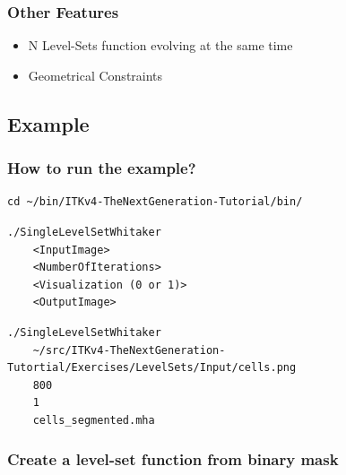 
\begin{frame}
\frametitle{Other Features}
  \begin{itemize}
    \item N Level-Sets function evolving at the same time
    \item Geometrical Constraints
  \end{itemize}
\end{frame}

\subsection{Example}


\begin{frame}[fragile]
  \frametitle{How to run the example?}
  \fontsize{8pt}{8pt}\selectfont
\begin{verbatim}
cd ~/bin/ITKv4-TheNextGeneration-Tutorial/bin/
\end{verbatim}
\newline
\begin{verbatim}
./SingleLevelSetWhitaker
    <InputImage>
    <NumberOfIterations>
    <Visualization (0 or 1)>
    <OutputImage>
\end{verbatim}
\newline
\begin{verbatim}
./SingleLevelSetWhitaker 
    ~/src/ITKv4-TheNextGeneration-Tutortial/Exercises/LevelSets/Input/cells.png 
    800 
    1 
    cells_segmented.mha
\end{verbatim}
\end{frame}

\begin{frame}
  \frametitle{Create a level-set function from binary mask}
\end{frame}

